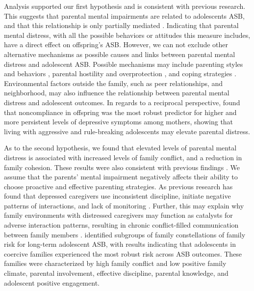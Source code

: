 \documentclass{sn-jnl}                  %
\begin{document}
Analysis supported our first hypothesis and is consistent with previous research. This suggests that parental mental impairments are related to adolescents ASB, and that this relationship is only partially mediated \citep{vera:2012, kane:2004, korhonen:2014}. Indicating that parental mental distress, with all the possible behaviors or attitudes this measure includes, have a direct effect on offspring's ASB. However, we can not exclude other alternative mechanisms as possible causes and links between parental mental distress and adolescent ASB. Possible mechanisms may include parenting styles and behaviors \citep{hautmann:2015, vera:2012}, parental hostility and overprotection \citep{sellers:2014}, and coping strategies \citep{francisco:2015}. Environmental factors outside the family, such as peer relationships, and neighborhood, may also influence the relationship between parental mental distress and adolescent outcomes. In regards to a reciprocal perspective, \citet{gross:2009} found that noncompliance in offspring was the most robust predictor for higher and more persistent levels of depressive symptoms among mothers, showing that living with aggressive and rule-breaking adolescents may elevate parental distress.

As to the second hypothesis, we found that elevated levels of parental mental distress is associated with increased levels of family conflict, and a reduction in family cohesion. These results were also consistent with previous findings \citep{garber:2005, perez:2018, xu:2017}. We assume that the parents' mental impairment negatively affects their ability to choose proactive and effective parenting strategies. As previous research has found that depressed caregivers use inconsistent discipline, initiate negative patterns of interactions, and lack of monitoring \citep{korhonen:2014}. Further, this may explain why family environments with distressed caregivers may function as catalysts for adverse interaction patterns, resulting in chronic conflict-filled communication between family members \citep{garber:2005}. \citet{lobraico:2020} identified subgroups of family constellations of family risk for long-term adolescent ASB, with results indicating that adolescents in coercive families experienced the most robust risk across ASB outcomes. These families were characterized by high family conflict and low positive family climate, parental involvement, effective discipline, parental knowledge, and adolescent positive engagement.
\end{document}
